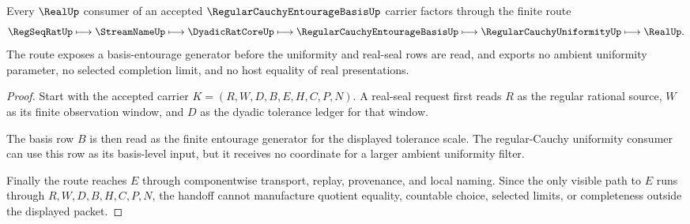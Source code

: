 \begin{theorem}
\label{thm:regular-cauchy-entourage-basis-real-handoff}
Every $\RealUp$ consumer of an accepted $\RegularCauchyEntourageBasisUp$ carrier factors through the finite route
$$
\RegSeqRatUp \longmapsto \StreamNameUp \longmapsto \DyadicRatCoreUp \longmapsto \RegularCauchyEntourageBasisUp \longmapsto \RegularCauchyUniformityUp \longmapsto \RealUp .
$$
The route exposes a basis-entourage generator before the uniformity and real-seal rows are read, and exports no ambient uniformity parameter, no selected completion limit, and no host equality of real presentations.
\end{theorem}
\begin{proof}
Start with the accepted carrier $K=(R,W,D,B,E,H,C,P,N)$. A real-seal request first reads $R$ as the regular rational source, $W$ as its finite observation window, and $D$ as the dyadic tolerance ledger for that window.

The basis row $B$ is then read as the finite entourage generator for the displayed tolerance scale. The regular-Cauchy uniformity consumer can use this row as its basis-level input, but it receives no coordinate for a larger ambient uniformity filter.

Finally the route reaches $E$ through componentwise transport, replay, provenance, and local naming. Since the only visible path to $E$ runs through $R,W,D,B,H,C,P,N$, the handoff cannot manufacture quotient equality, countable choice, selected limits, or completeness outside the displayed packet.
\end{proof}




